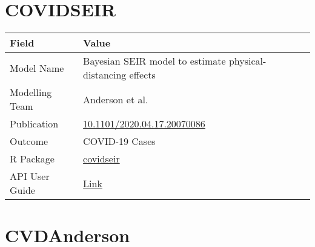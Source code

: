 \documentclass[
]{book}
\begin{document}
\hypertarget{covidseir}{%
\chapter{COVIDSEIR}\label{covidseir}}

\begin{longtable}[]{@{}ll@{}}
\toprule
Field & Value\tabularnewline
\midrule
\endhead
Model Name & Bayesian SEIR model to estimate physical-distancing effects\tabularnewline
Modelling Team & Anderson et al.\tabularnewline
Publication & \href{https://doi.org/10.1101/2020.04.17.20070086}{10.1101/2020.04.17.20070086}\tabularnewline
Outcome & COVID-19 Cases\tabularnewline
R Package & \href{https://github.com/seananderson/covidseir}{covidseir}\tabularnewline
API User Guide & \href{https://resplab.github.io/prismguide/api-users-guide.html\#covidseir-1}{Link}\tabularnewline
\bottomrule
\end{longtable}

\hypertarget{cvdanderson}{%
\chapter{CVDAnderson}\label{cvdanderson}}
\end{document}
